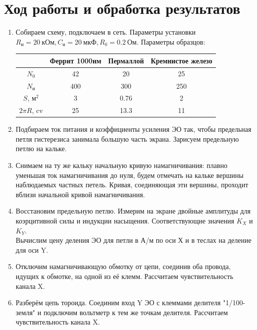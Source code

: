 \documentclass[12pt]{article}
\begin{document}
\section*{Ход работы и обработка результатов}
\begin{enumerate}
\item Собираем схему, подключаем в сеть. Параметры установки $R_\text{и} = 20~\text{кОм}, C_\text{и} = 20~\text{мкФ}, R_0 = 0.2~\text{Ом}$. Параметры образцов:
\begin{table}[h]
\centering
\begin{tabular}{|c|c||c||c|}
\hline
      & Феррит 1000нм & Пермаллой & Кремнистое железо \\ \hline
$N_0$    & 42            & 20        & 25                \\ \hline
$N_\text{и}$    & 400           & 300       & 250               \\ \hline
$S$, м$^2$     & 3        & 0.76  & 2            \\ \hline
$2\pi R$, cv & 25          & 13.3     & 11              \\ \hline
\end{tabular}
\end{table}
\item Подбираем ток питания и коэффициенты усиления ЭО так, чтобы предельная петля гистерезиса занимала большую часть экрана. Зарисуем предельную петлю на кальке.
\item Снимаем на ту же кальку начальную кривую намагничивания: плавно уменьшая ток намагничивания до нуля, будем отмечать на кальке вершины наблюдаемых частных петель. Кривая, соединяющая эти вершины, проходит вблизи начальной кривой намагничивания. 
\item Восстановим предельную петлю. Измерим на экране двойные амплитуды для коэрцитивной силы и индукции насыщения. Соответствующие значения $K_X$ и $K_Y$.\\
Вычислим цену деления ЭО для петли в А/м по оси Х и в теслах на деление для оси Y.
\item Отключим намагничивающую обмотку от цепи, соединив оба провода, идущих к обмотке, на одной из её клемм. Рассчитаем чувствительность канала X.
\item Разберём цепь тороида. Соединим вход Y ЭО с клеммами делителя "1/100-земля" и подключим вольтметр к тем же точкам делителя. Рассчитаем чувствительность канала X.
\begin{table}[t]
\centering
\begin{tabular}{|c|c|c||c|c||c|c|}
\hline

\end{tabular}
\end{table}
\end{enumerate}
\end{document}
